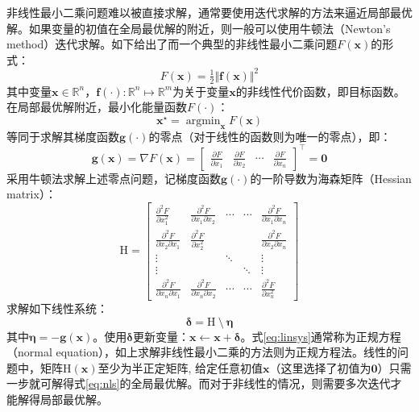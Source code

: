 非线性最小二乘问题难以被直接求解，通常要使用迭代求解的方法来逼近局部最优解。如果变量的初值在全局最优解的附近，则一般可以使用牛顿法（Newton's method）迭代求解。如下给出了而一个典型的非线性最小二乘问题$F(\bm{x})$的形式：
\begin{equation}
    F(\bm{x}) = \tfrac{1}{2} \Vert \bm{f}(\bm{x}) \Vert^2
\label{eq:nls}
\end{equation}
其中变量$\bm{x}\in\mathbb{R}^n$，$\bm{f}(\cdot):\mathbb{R}^n\mapsto\mathbb{R}^m$为关于变量$\bm{x}$的非线性代价函数，即目标函数。在局部最优解附近，最小化能量函数$F(\cdot)$：
\begin{equation}
    \bm{x}^\star = \mathop{\arg\min}_{\bm{x}} F(\bm{x})
\end{equation}
等同于求解其梯度函数$\bm{g}(\cdot)$的零点（对于线性的函数则为唯一的零点），即：
\begin{equation}
    \bm{g}(\bm{x}) = \nabla F(\bm{x}) = \begin{bmatrix}
        \frac{\partial F}{\partial x_1} &
        \frac{\partial F}{\partial x_2} &
        \cdots &
        \frac{\partial F}{\partial x_n}
    \end{bmatrix}^\top = \bm{0}
\end{equation}
采用牛顿法求解上述零点问题，记梯度函数$\bm{g}(\cdot)$的一阶导数为海森矩阵（Hessian matrix）：
\begin{equation}
    \mathrm{H} = \begin{bmatrix}
        \frac{\partial^2 F}{\partial x_1^2} &
        \frac{\partial^2 F}{\partial x_1 \partial x_2} &
        \cdots & \cdots &
        \frac{\partial^2 F}{\partial x_1 \partial x_n} \\
        \frac{\partial^2 F}{\partial x_2 \partial x_1} &
        \frac{\partial^2 F}{\partial x_2^2} &
        & &
        \frac{\partial^2 F}{\partial x_2 \partial x_n} \\
        \vdots & & \ddots & & \vdots \\
        \vdots & & & \ddots & \vdots \\
        \frac{\partial^2 F}{\partial x_n \partial x_1} &
        \frac{\partial^2 F}{\partial x_n \partial x_2} &
        \cdots & \cdots &
        \frac{\partial^2 F}{\partial x_n^2}
    \end{bmatrix}
\end{equation}
求解如下线性系统：
\begin{equation}
    \bm{\delta} = \mathrm{H} \:\setminus\: \bm{\eta}
    \label{eq:linsys}
\end{equation}
其中$\bm{\eta}=-\bm{g}(\bm{x})$。使用$\bm{\delta}$更新变量：$\bm{x}\leftarrow\bm{x}+\bm{\delta}$。式\eqref{eq:linsys}通常称为正规方程（normal equation），如上求解非线性最小二乘的方法则为正规方程法。线性的问题中，矩阵$\mathrm{H}(\bm{x})$至少为半正定矩阵, 给定任意初值$\bm{x}$（这里选择了初值为$\bm{0}$）只需一步就可解得式\eqref{eq:nls}的全局最优解。而对于非线性的情况，则需要多次迭代才能解得局部最优解。

